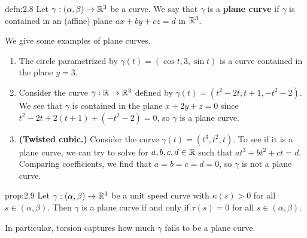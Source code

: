 \begin{defn}{defn:2.8}
    Let $\gamma : (\alpha, \beta) \to \mathbb{R}^3$ be a curve. We say that $\gamma$ 
    is a {\bf plane curve} if $\gamma$ is contained in an (affine) plane 
    $ax + by + cz = d$ in $\mathbb{R}^3$. 
\end{defn}\vspace{-0.25cm}

We give some examples of plane curves. 
\begin{enumerate}[(1)]
    \item The circle parametrized by $\gamma(t) = (\cos t, 3, \sin t)$ is a
    curve contained in the plane $y = 3$.
    \item Consider the curve $\gamma : \mathbb{R} \to \mathbb{R}^3$ defined by 
    $\gamma(t) = (t^2-2t, t+1, -t^2-2)$. We see that 
    $\gamma$ is contained in the plane 
    $x + 2y + z = 0$ since $t^2 - 2t + 2(t+1) + (-t^2-2) = 0$,
    so $\gamma$ is a plane curve.
    \item {\bf (Twisted cubic.)} Consider the curve $\gamma(t) = (t^3, t^2, t)$. 
    To see if it is a plane curve, we can try to solve for $a, b, c, d \in \mathbb{R}$ 
    such that $at^3 + bt^2 + ct = d$. Comparing coefficients, we find that 
    $a = b = c = d = 0$, so $\gamma$ is not a plane curve.
\end{enumerate}

\begin{prop}{prop:2.9}
    Let $\gamma : (\alpha, \beta) \to \mathbb{R}^3$ be a unit speed curve with 
    $\kappa(s) > 0$ for all $s \in (\alpha, \beta)$. Then $\gamma$ is a 
    plane curve if and only if $\tau(s) = 0$ for all $s \in (\alpha, \beta)$.
\end{prop}\vspace{-0.25cm}

In particular, torsion captures how much $\gamma$ fails to be a plane curve.

